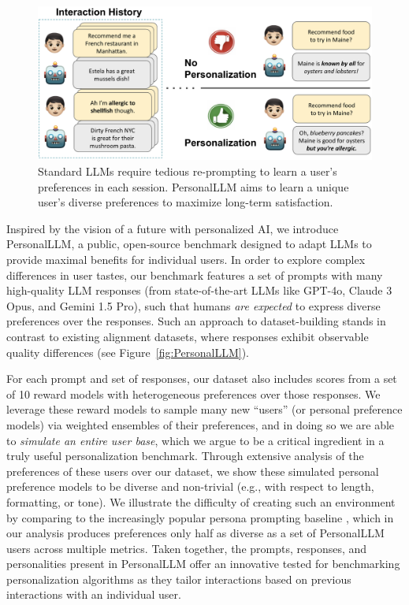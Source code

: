 \begin{figure}[t]
    \centering
    \includegraphics[width=\textwidth]{figures/fig1new.png}
    \caption{
    Standard LLMs require tedious re-prompting to learn a user’s preferences in each session. \textsf{PersonalLLM} aims to learn a unique user's diverse preferences to maximize long-term satisfaction.}
    \label{fig:main_figure}
\end{figure}

Inspired by the vision of a future with personalized AI, we introduce \textsf{PersonalLLM}, a public, open-source benchmark designed to adapt LLMs to provide maximal benefits for individual users. In order to explore complex differences in user tastes, our benchmark features a set of prompts with many high-quality LLM responses (from state-of-the-art LLMs like GPT-4o, Claude 3 Opus, and Gemini 1.5 Pro), such that humans \textit{are expected} to express diverse preferences over the responses.
Such an approach to dataset-building stands in contrast to existing alignment datasets, where responses exhibit observable quality differences (see Figure~\ref{fig:PersonalLLM}).

For each prompt and set of responses, our dataset also includes scores from a set of 10 reward models with heterogeneous preferences over those responses.
We leverage these reward models to sample many new ``users'' (or personal preference models) via weighted ensembles of their preferences, and in doing so we are able to \textit{simulate an entire user base}, which we argue to be a critical ingredient in a truly useful personalization benchmark.  
Through extensive analysis of the preferences of these users over our dataset, we show these simulated personal preference models to be diverse and non-trivial (e.g., with respect to length, formatting, or tone). We illustrate the difficulty of creating such an environment by comparing to the increasingly popular persona prompting baseline \citep{castricato2024personareproducibletestbedpluralistic, chan2024scalingsyntheticdatacreation, jang2023personalizedsoupspersonalizedlarge}, which in our analysis produces preferences only half as diverse as a set of \textsf{PersonalLLM} users across multiple metrics.
Taken together, the prompts, responses, and personalities present in \textsf{PersonalLLM} offer an innovative tested for benchmarking personalization algorithms as they tailor interactions based on previous interactions with an individual user.

